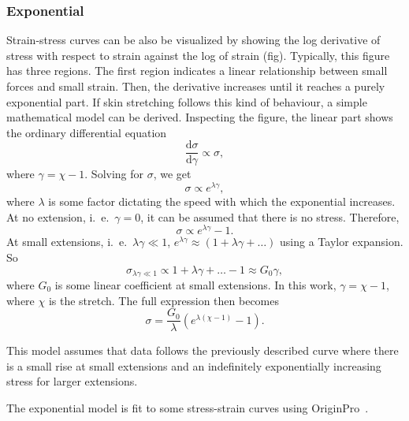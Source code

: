 \subsubsection{Exponential}
Strain-stress curves can be also be visualized by showing the log derivative of stress with respect to strain against the log of strain (fig).
Typically, this figure has three regions.
The first region indicates a linear relationship between small forces and small strain.
Then, the derivative increases until it reaches a purely exponential part.
If skin stretching follows this kind of behaviour, a simple mathematical model can be derived.
Inspecting the figure, the linear part shows the ordinary differential equation
\begin{equation}
    \frac{\mathrm{d}\sigma}{\mathrm{d}\gamma} \propto \sigma,
\end{equation}
where $\gamma = \chi - 1$.
Solving for $\sigma$, we get
\begin{equation}
    \sigma \propto e^{\lambda\gamma},
\end{equation}
where $\lambda$ is some factor dictating the speed with which the exponential increases.
At no extension, i.\ e.\ $\gamma=0$, it can be assumed that there is no stress.
Therefore,
\begin{equation}
    \sigma \propto e^{\lambda\gamma} - 1.
\end{equation}
At small extensions, i.\ e.\ $\lambda\gamma \ll 1$, $e^{\lambda\gamma} \approx (1 + \lambda\gamma + \ldots)$ using a Taylor expansion.
So
\begin{equation}
    \sigma_{\lambda\gamma\ll 1} \propto 1 + \lambda\gamma + \ldots - 1 \approx G_0 \gamma,
\end{equation}
where $G_0$ is some linear coefficient at small extensions.
In this work, $\gamma = \chi - 1$, where $\chi$ is the stretch.
The full expression then becomes
\begin{equation}\label{eq:exp}
    \sigma = \frac{G_0}{\lambda}\left(e^{\lambda(\chi - 1)}-1\right).
\end{equation}

This model assumes that data follows the previously described curve where there is a small rise at small extensions and an indefinitely exponentially increasing stress for larger extensions.

The exponential model is fit to some stress-strain curves using OriginPro~\cite{OriginPro}.

